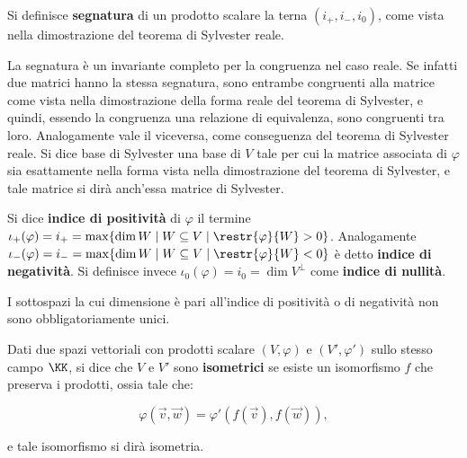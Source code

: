 \documentclass[11pt]{article}
\begin{document}
	\begin{definition}
		Si definisce \textbf{segnatura} di un prodotto scalare
		la terna $(i_+, i_-, i_0)$, come vista nella dimostrazione
		del teorema di Sylvester reale.
	\end{definition}

	\begin{remark} \nl
		\li La segnatura è un invariante completo per la congruenza nel caso reale. Se infatti due matrici hanno la stessa segnatura, sono
		entrambe congruenti alla matrice come vista nella dimostrazione
		della forma reale del teorema di Sylvester, e quindi, essendo
		la congruenza una relazione di equivalenza, sono congruenti
		tra loro. Analogamente vale il viceversa, come conseguenza del
		teorema di Sylvester reale.
		\li Si dice base di Sylvester una base di $V$ tale per cui la
		matrice associata di $\varphi$ sia esattamente nella forma
		vista nella dimostrazione del teorema di Sylvester, e
		tale matrice si dirà anch'essa matrice di Sylvester.
		
	\end{remark}

	\begin{definition}
		Si dice \textbf{indice di positività} di $\varphi$ il
		termine $\iota_+(\varphi) = i_+ = \max \{ \dim W \mid W \subseteq V \mid \restr{\varphi}{W} > 0 \}$. Analogamente $\iota_-(\varphi) = i_- = \max \{ \dim W \mid W \subseteq V \mid \restr{\varphi}{W} < 0 \}$ è detto
		\textbf{indice di negatività}. Si definisce invece $\iota_0(\varphi) = i_0 = \dim V^\perp$ come \textbf{indice di nullità}.
	\end{definition}

	\begin{remark}\nl
		\li I sottospazi la cui dimensione è pari all'indice di positività
		o di negatività non sono obbligatoriamente unici.
	\end{remark}

	\begin{definition}
		Dati due spazi vettoriali con prodotti scalare $(V, \varphi)$ e
		$(V', \varphi')$ sullo stesso campo $\KK$, si dice che
		$V$ e $V'$ sono \textbf{isometrici} se esiste un isomorfismo
		$f$ che preserva i prodotti, ossia tale che:
		
		\[ \varphi(\vec v, \vec w) = \varphi'(f(\vec v), f(\vec w)), \]
		
		e tale isomorfismo si dirà isometria.
	\end{definition}
\end{document}
